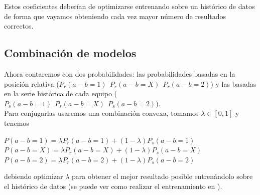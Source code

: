 Estos coeficientes deberían de optimizarse entrenando sobre un histórico de datos de forma que vayamos obteniendo cada vez mayor número de resultados correctos.

\subsection{Combinación de modelos}
Ahora contaremos con dos probabilidades: las probabilidades basadas en la posición relativa ($P_{r}(a-b=1) \ \ P_{r}(a-b=X) \ \ P_{r}(a-b=2)$) y las basadas en la serie histórica de cada equipo ($P_{s}(a-b=1) \ \ P_{s}(a-b=X) \ \ P_{s}(a-b=2)$).\\

Para conjugarlas usaremos una combinación convexa, tomamos $\lambda \in [0,1]$ y tenemos
\begin{center}
	$ P(a-b=1) = \lambda P_{r}(a-b=1) + (1-\lambda) P_{s}(a-b=1)$\\
	$ P(a-b=X) = \lambda P_{r}(a-b=X) + (1-\lambda) P_{s}(a-b=X)$\\
	$ P(a-b=2) = \lambda P_{r}(a-b=2) + (1-\lambda) P_{s}(a-b=2)$
\end{center}
debiendo optimizar $\lambda$ para obtener el mejor resultado posible entrenándolo sobre el histórico de datos (se puede ver como realizar el entrenamiento en \cite[Capítulo 3]{tfgjavi}).